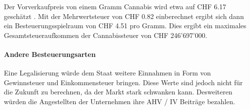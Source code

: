 \documentclass[../main.tex]{subfiles}
\begin{document}
	 \noindent
	 Der Vorverkaufpreis von einem Gramm Cannabis wird etwa auf CHF 6.17 geschätzt \cite{bandli}.
	 Mit der Mehrwertsteuer von CHF 0.82 einberechnet ergibt sich dann ein Besteuerungsspielraum von CHF 4.51 pro Gramm.
	 Dies ergibt ein maximales Gesamtsteueraufkommen der Cannabissteuer von CHF 246'697'000.
	 
	 
	 \paragraph{Andere Besteuerungsarten}
	 Eine Legalisierung würde dem Staat weitere Einnahmen in Form von Gewinnsteuer und Einkommensteuer bringen.
	 Diese Werte sind jedoch nicht für die Zukunft zu berechnen, da der Markt stark schwanken kann.
	 Desweiteren würden die Angestellten der Unternehmen ihre AHV / IV Beiträge bezahlen.
	 
	 
\end{document}
